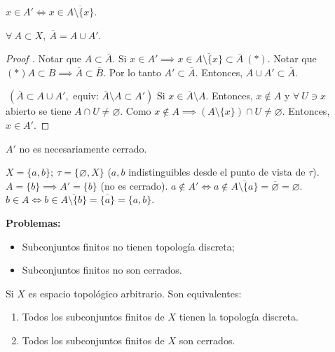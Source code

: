 \documentclass[a4paper]{report}
\begin{document}
	\begin{remark}
		$x \in A' \iff x \in \overline{A \setminus \{x\}}$. 
	\end{remark}

	\begin{lemma}
		$\forall \ A \subset X,\ \overline{A} = A \cup A'$.
	\end{lemma}

	\begin{proof}[Proof ]
		\fbox{$\supset$} Notar que $A \subset \overline{A}$. Si $x \in A' \implies x \in \overline{A \setminus \{x\}} \subset \overline{A} \ (*)$. Notar que $(*) A \subset B \implies \overline{A} \subset \overline{B}$. Por lo tanto $A' \subset \overline{A}$. Entonces, $A \cup A' \subset \overline{A}$.

		\noindent \fbox{$\subset$} $\ (\overline{A} \subset A \cup A', \text{ equiv: } \overline{A}\setminus A \subset A')$ Si $x \in \overline{A} \setminus A$. Entonces, $x \not\in A$ y $\forall \ U \ni x$ abierto se tiene $A \cap U \neq \varnothing$. Como $x \not\in A \implies (A \setminus \{x\}) \cap U \neq \varnothing$. Entonces, $x \in A'$.  
	\end{proof}

	\begin{remark}
		$A'$ no es necesariamente cerrado.
	\end{remark}

	\begin{eg}
		$X = \{ a,b \};\ \tau = \{ \varnothing, X \}$ ($a,b$ indistinguibles desde el punto de vista de $\tau$). $A = \{ b \} \implies A' = \{b\} $ (no es cerrado). $a \not\in A' \iff a \not\in \overline{A \setminus \{a\} } = \overline{\varnothing} = \varnothing$. $b \in A \iff b \in \overline{A \setminus \{b\} } = \overline{\{a\}} = \{a,b\}$.      
	\end{eg}

	\noindent \textbf{Problemas:}
	\begin{itemize}
		\item Subconjuntos finitos no tienen topología discreta;

		\item Subconjuntos finitos no son cerrados.
	\end{itemize}

	\begin{lemma}
		Si $X$ es espacio topológico arbitrario. Son equivalentes:
		\begin{enumerate}
			\item Todos los subconjuntos finitos de $X$ tienen la topología discreta.

			\item Todos los subconjuntos finitos de $X$ son cerrados.
		\end{enumerate}
	\end{lemma}
\end{document}
